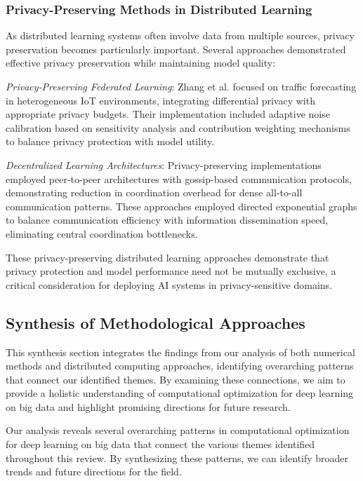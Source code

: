 \documentclass[acmsmall]{acmart}
\begin{document}
\subsubsection{Privacy-Preserving Methods in Distributed Learning}\label{subsubsec:scalability-characteristics-rq22:privacy-preserving-methods-in-distributed-learning}
As distributed learning systems often involve data from multiple sources, privacy preservation becomes particularly important. Several approaches demonstrated effective privacy preservation while maintaining model quality:

\textit{Privacy-Preserving Federated Learning}: Zhang et al. \citep{Zhang20229876} focused on traffic forecasting in heterogeneous IoT environments, integrating differential privacy with appropriate privacy budgets. Their implementation included adaptive noise calibration based on sensitivity analysis and contribution weighting mechanisms to balance privacy protection with model utility.

\textit{Decentralized Learning Architectures}: Privacy-preserving implementations employed peer-to-peer architectures with gossip-based communication protocols, demonstrating reduction in coordination overhead for dense all-to-all communication patterns. These approaches employed directed exponential graphs to balance communication efficiency with information dissemination speed, eliminating central coordination bottlenecks.

These privacy-preserving distributed learning approaches demonstrate that privacy protection and model performance need not be mutually exclusive, a critical consideration for deploying AI systems in privacy-sensitive domains.

\subsection{Synthesis of Methodological Approaches}\label{subsec:synthesis-of-methodological-approaches}
This synthesis section integrates the findings from our analysis of both numerical methods and distributed computing approaches, identifying overarching patterns that connect our identified themes. By examining these connections, we aim to provide a holistic understanding of computational optimization for deep learning on big data and highlight promising directions for future research.

Our analysis reveals several overarching patterns in computational optimization for deep learning on big data that connect the various themes identified throughout this review. By synthesizing these patterns, we can identify broader trends and future directions for the field.
\end{document}
